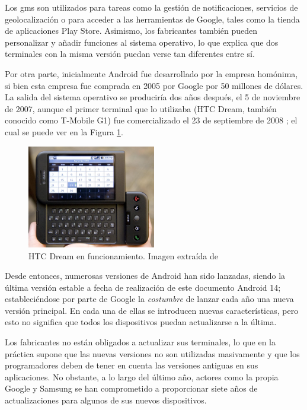         Los \gls{gms} son utilizados para tareas como la gestión de notificaciones, servicios de geolocalización o para acceder a las herramientas de Google, tales como la tienda de aplicaciones Play Store. Asimismo, los fabricantes también pueden personalizar y añadir funciones al sistema operativo, lo que explica que dos terminales con la misma versión puedan verse tan diferentes entre sí. 
        
        Por otra parte, inicialmente Android fue desarrollado por la empresa homónima, si bien esta empresa fue comprada en 2005 por Google por 50 millones de dólares. La salida del sistema operativo se produciría dos años después, el 5 de noviembre de 2007, aunque el primer terminal que lo utilizaba (HTC Dream, también conocido como 
        T-Mobile G1) fue comercializado el 23 de septiembre de 2008 \cite{adeva_android_2023} \cite{marquez_asi_2022}; el cual se puede ver en la Figura \ref{figure:android:htc_dream}.

        \begin{figure}[h]
            \centering
            \includegraphics[width=0.5\textwidth]{figures/HTC Dream.jpg}
            \caption[HTC Dream en funcionamiento]{HTC Dream en funcionamiento. Imagen extraída de \cite{oryl_t-mobile_2008}}
            \label{figure:android:htc_dream}
        \end{figure}

        Desde entonces, numerosas versiones de Android han sido lanzadas, siendo la última versión estable a fecha de realización de este documento Android 14; estableciéndose por parte de Google la \textit{costumbre} de lanzar cada año una nueva versión principal. En cada una de ellas se introducen nuevas características, pero esto no significa que todos los dispositivos puedan actualizarse a la última. 
        
        Los fabricantes no están obligados a actualizar sus terminales, lo que en la práctica supone que las nuevas versiones no son utilizadas masivamente y que los programadores deben de tener en cuenta las versiones antiguas en sus aplicaciones. No obstante, a lo largo del último año, actores como la propia Google \cite{ricca_google_2023} y Samsung \cite{ramirez_samsung_2024} se han comprometido a proporcionar siete años de actualizaciones para algunos de sus nuevos dispositivos.
        
